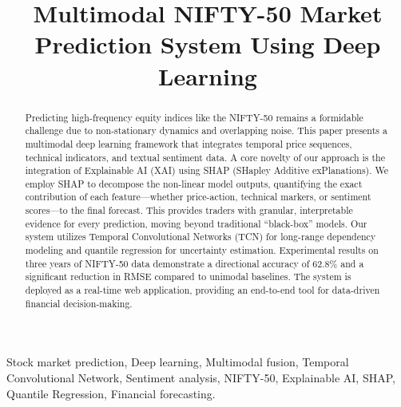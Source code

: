 \documentclass[conference]{IEEEtran}
\begin{document}
\title{Multimodal NIFTY-50 Market Prediction System Using Deep Learning}

\author{
\and
{}
\and
{}
}

\maketitle

\begin{abstract}
Predicting high-frequency equity indices like the NIFTY-50 remains a formidable challenge due to non-stationary dynamics and overlapping noise. This paper presents a multimodal deep learning framework that integrates temporal price sequences, technical indicators, and textual sentiment data. A core novelty of our approach is the integration of Explainable AI (XAI) using SHAP (SHapley Additive exPlanations). We employ SHAP to decompose the non-linear model outputs, quantifying the exact contribution of each feature—whether price-action, technical markers, or sentiment scores—to the final forecast. This provides traders with granular, interpretable evidence for every prediction, moving beyond traditional ``black-box'' models. Our system utilizes Temporal Convolutional Networks (TCN) for long-range dependency modeling and quantile regression for uncertainty estimation. Experimental results on three years of NIFTY-50 data demonstrate a directional accuracy of 62.8\% and a significant reduction in RMSE compared to unimodal baselines. The system is deployed as a real-time web application, providing an end-to-end tool for data-driven financial decision-making.
\end{abstract}

\begin{IEEEkeywords}
Stock market prediction, Deep learning, Multimodal fusion, Temporal Convolutional Network, Sentiment analysis, NIFTY-50, Explainable AI, SHAP, Quantile Regression, Financial forecasting.
\end{IEEEkeywords}
\end{document}
